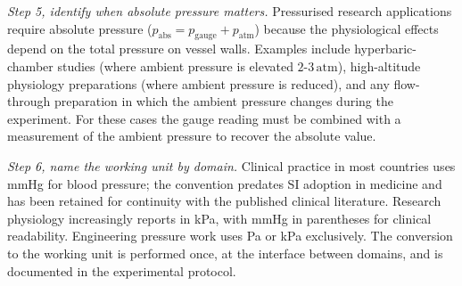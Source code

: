 \begin{exercise}
\textit{Step 5, identify when absolute pressure matters.}
Pressurised research applications require absolute pressure
($p_{\text{abs}} = p_{\text{gauge}} + p_{\text{atm}}$) because the
physiological effects depend on the total pressure on vessel walls.
Examples include hyperbaric-chamber studies (where ambient pressure
is elevated $2$-$3 \,\text{atm}$), high-altitude physiology
preparations (where ambient pressure is reduced), and any
flow-through preparation in which the ambient pressure changes
during the experiment. For these cases the gauge reading must be
combined with a measurement of the ambient pressure to recover the
absolute value.

\textit{Step 6, name the working unit by domain.} Clinical practice
in most countries uses mmHg for blood pressure; the convention
predates SI adoption in medicine and has been retained for
continuity with the published clinical literature. Research
physiology increasingly reports in kPa, with mmHg in parentheses
for clinical readability. Engineering pressure work uses Pa or kPa
exclusively. The conversion to the working unit is performed once,
at the interface between domains, and is documented in the
experimental protocol.
\end{exercise}

